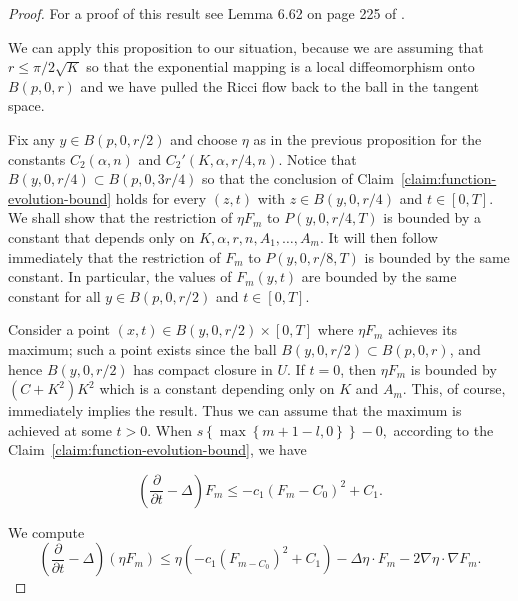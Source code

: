 \begin{proof}
\sketch
For a proof of this result see Lemma 6.62 on page 225 of
\cite{ChowLuNi}.

We can apply this proposition to our situation, because we are
assuming that $r\le \pi/2\sqrt{K}$ so that the exponential mapping
is a local diffeomorphism onto $B(p,0,r)$ and we have pulled the
Ricci flow back to the ball in the tangent space.

Fix any $y\in B(p,0,r/2)$ and choose $\eta$ as in the previous
proposition for the constants $C_2(\alpha,n)$ and
$C_2'(K,\alpha,r/4,n)$. Notice that $B(y,0,r/4)\subset B(p,0,3r/4)$
so that the conclusion of Claim~\ref{claim:function-evolution-bound} holds for every $(z,t)$
with $z\in B(y,0,r/4)$ and $t\in [0,T]$.  We shall show that the restriction of $\eta
F_m$ to $P(y,0,r/4,T)$ is bounded by a constant that depends only on
$K,\alpha,r,n,A_1,\ldots,A_m$. It will then follow immediately that
the restriction of $F_m$ to $P(y,0,r/8,T)$ is bounded by the same
constant. In particular, the values of $F_m(y,t)$ are bounded by the
same constant for all $y\in B(p,0,r/2)$ and $t\in [0,T]$.

 Consider a point $(x,t)\in B(y,0,r/2)\times
[0,T]$ where $\eta F_m$ achieves its maximum; such a point exists
since the ball $B(y,0,r/2)\subset B(p,0,r)$, and hence $B(y,0,r/2)$
has compact closure in $U$. If $t=0$, then $\eta F_m$ is bounded by
$(C+K^2)K^2$ which is a constant depending only on $K$ and $A_m$.
This, of course, immediately implies the result. Thus we can assume
that the maximum is achieved at some $t>0$. When $s\left\{
\max\left\{ m+1-l,0\right\} \right\}  -0,$ according to the
Claim~\ref{claim:function-evolution-bound}, we have

\[
\left(  \frac{\partial}{\partial t}-\Delta\right)
F_{m}\leq-c_1\left( F_{m}-C_0\right)  ^{2}+C_1.
\]

We compute
\[
\left(  \frac{\partial}{\partial t}-\Delta\right)  \left(  \eta
F_{m}\right) \leq\eta\left(  -c_1\left(
F_{m-C_0}\right)^{2}+C_1\right) -\Delta\eta\cdot
F_m-2\nabla\eta\cdot\nabla F_m.
\]



\end{proof}
